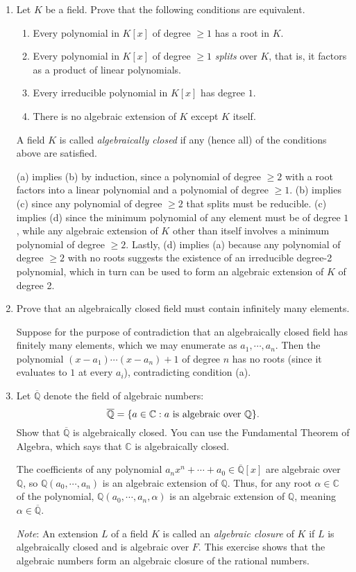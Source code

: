 \documentclass[12pt]{article}
\newcommand{\QQ}{\mathbb{Q}}
\newcommand{\CC}{\mathbb{C}}
\begin{document}
\begin{enumerate}
    \item Let $K$ be a field. Prove that the following conditions are equivalent. 
    \begin{enumerate}
        \item Every polynomial in $K[x]$ of degree $\geq 1$ has a root in $K$.
        \item Every polynomial in $K[x]$ of degree $\geq 1$ {\em splits} over $K$, that is, it factors as a product of linear polynomials.
        \item Every irreducible polynomial in $K[x]$ has degree $1$.
        \item There is no algebraic extension of $K$ except $K$ itself.
    \end{enumerate}
    A field $K$ is called {\em algebraically closed} if any (hence all) of the conditions above are satisfied. \par
    (a) implies (b) by induction, since a polynomial of degree $\geq 2$ with a root factors into a linear polynomial and a polynomial of degree $\geq 1$. (b) implies (c) since any polynomial of degree $\geq 2$ that splits must be reducible. (c) implies (d) since the minimum polynomial of any element must be of degree $1$, while any algebraic extension of $K$ other than itself involves a minimum polynomial of degree $\geq 2$. Lastly, (d) implies (a) because any polynomial of degree $\geq 2$ with no roots suggests the existence of an irreducible degree-2 polynomial, which in turn can be used to form an algebraic extension of $K$ of degree 2.

    \item Prove that an algebraically closed field must contain infinitely many elements. \par
        Suppose for the purpose of contradiction that an algebraically closed field has finitely many elements, which we may enumerate as $a_1, \cdots, a_n$. Then the polynomial $(x - a_1) \cdots (x - a_n) + 1$ of degree $n$ has no roots (since it evaluates to $1$ at every $a_i$), contradicting condition (a).

    \item Let $\overline{\QQ}$ denote the field of algebraic numbers:
    $$
        \overline{\QQ} = \{a \in \CC : a \textup{ is algebraic over }\QQ \}.
    $$
    Show that $\overline{\QQ}$ is algebraically closed.  You can use the Fundamental Theorem of Algebra, which says that $\CC$ is algebraically closed. \par
    The coefficients of any polynomial $a_n x^n + \cdots + a_0 \in \overline{\QQ}[x]$ are algebraic over $\mathbb{Q}$, so $\mathbb{Q}(a_0, \cdots, a_n)$ is an algebraic extension of $\QQ$. Thus, for any root $\alpha \in \mathbb{C}$ of the polynomial, $\mathbb{Q}(a_0, \cdots, a_n, \alpha)$ is an algebraic extension of $\QQ$, meaning $\alpha \in \overline{\QQ}$. \par
    {\em Note}:  An extension $L$ of a field $K$ is called an {\em algebraic closure} of $K$ if $L$ is algebraically closed and is algebraic over $F$.  This exercise shows that the algebraic numbers form an algebraic closure of the rational numbers.


\end{enumerate}
\end{document}
